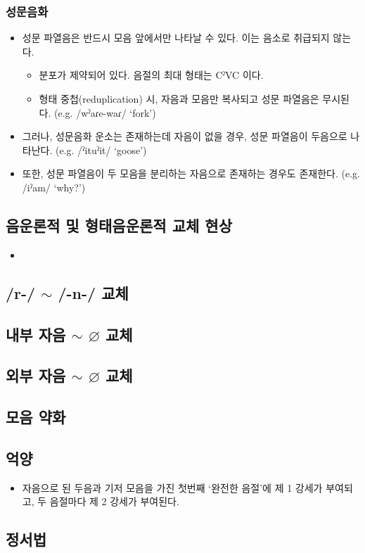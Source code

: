 \subsubsection{성문음화}
\begin{itemize}
\item 성문 파열음은 반드시 모음 앞에서만 나타날 수 있다. 이는 음소로 취급되지 않는다.
\begin{itemize}
\item 분포가 제약되어 있다. 음절의 최대 형태는 CˀVC 이다. 
\item 형태 중첩(reduplication) 시, 자음과 모음만 복사되고 성문 파열음은 무시된다. (e.g. /wˀaɾe-waɾ/ `fork’)
\end{itemize}
\item 그러나, 성문음화 운소는 존재하는데 자음이 없을 경우, 성문 파열음이 두음으로 나타난다. (e.g. /ˀituˀit/ `goose’)
\item 또한, 성문 파열음이 두 모음을 분리하는 자음으로 존재하는 경우도 존재한다. (e.g. /iˀam/ `why?’)
\end{itemize}

\subsection{음운론적 및 형태음운론적 교체 현상}
\begin{itemize}
\item 
\end{itemize}

\subsection{/r-/ $\sim$ /-n-/ 교체}
\subsection{내부 자음 $\sim$ $\varnothing$ 교체}
\subsection{외부 자음 $\sim$ $\varnothing$ 교체}
\subsection{모음 약화}

\subsection{억양}
\begin{itemize}
\item 자음으로 된 두음과 기저 모음을 가진 첫번째 `완전한 음절’에 제 1 강세가 부여되고, 두 음절마다 제 2 강세가 부여된다.
\end{itemize}
\subsection{정서법}
\omission
